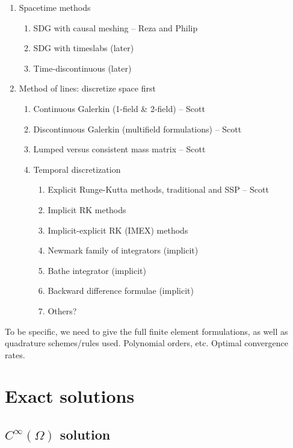 \documentclass[12pt]{article}
\begin{document}
\begin{enumerate}
\item Spacetime methods
\begin{enumerate}
\item SDG with causal meshing -- Reza and Philip
\item SDG with timeslabs (later)
\item Time-discontinuous (later)
\end{enumerate}
\item Method of lines:  discretize space first
\begin{enumerate}
\item Continuous Galerkin (1-field \& 2-field) -- Scott
\item Discontinuous Galerkin (multifield formulations) -- Scott
\item Lumped versus consistent mass matrix -- Scott
\item Temporal discretization
\begin{enumerate}
\item Explicit Runge-Kutta methods, traditional and SSP -- Scott
\item Implicit RK methods
\item Implicit-explicit RK (IMEX) methods
\item Newmark family of integrators (implicit)
\item Bathe integrator (implicit)
\item Backward difference formulae (implicit)
\item Others?
\end{enumerate}
\end{enumerate}
\end{enumerate}

To be specific, we need to give the full finite element formulations,
as well as quadrature schemes/rules used.  Polynomial orders, etc.
Optimal convergence rates.


\section{Exact solutions}


\subsection{$C^\infty(\Omega)$ solution}
\end{document}
